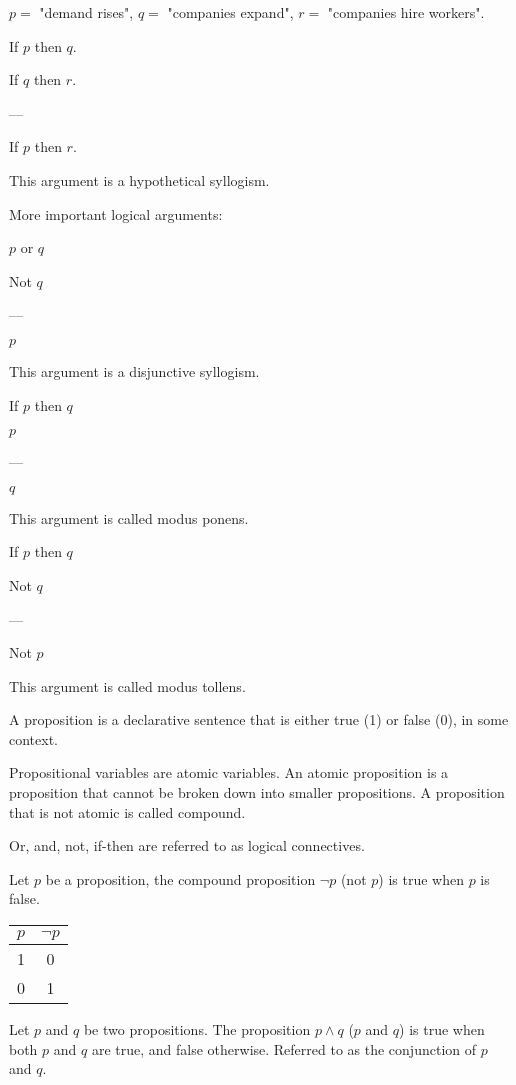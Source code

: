 \documentclass{article}
\begin{document}
$p = $ "demand rises", $q = $ "companies expand", $r = $ "companies hire workers". 

If $p$ then $q$. 

If $q$ then $r$. 

---

If $p$ then $r$. 

This argument is a hypothetical syllogism. 

More important logical arguments:

$p$ or $q$

Not $q$

---

$p$

This argument is a disjunctive syllogism. 

If $p$ then $q$

$p$

---

$q$

This argument is called modus ponens. 

If $p$ then $q$

Not $q$

---

Not $p$

This argument is called modus tollens. 

A proposition is a declarative sentence that is either true (1) or false (0), in some context. 

Propositional variables are atomic variables. An atomic proposition is a proposition that cannot be broken down into smaller propositions. A proposition that is not atomic is called compound. 

Or, and, not, if-then are referred to as logical connectives. 

Let $p$ be a proposition, the compound proposition $\neg p$ (not $p$) is true when $p$ is false.

\begin{table}[h]
    \centering
    \begin{tabular}{|c|c|} \hline
        $p$ & $\neg p$\\ \hline
        1 & 0\\ \hline
        0 & 1\\ \hline
    \end{tabular}
\end{table}

Let $p$ and $q$ be two propositions. The proposition $p \wedge q$ ($p$ and $q$) is true when both $p$ and $q$ are true, and false otherwise. Referred to as the conjunction of $p$ and $q$. 
\end{document}
